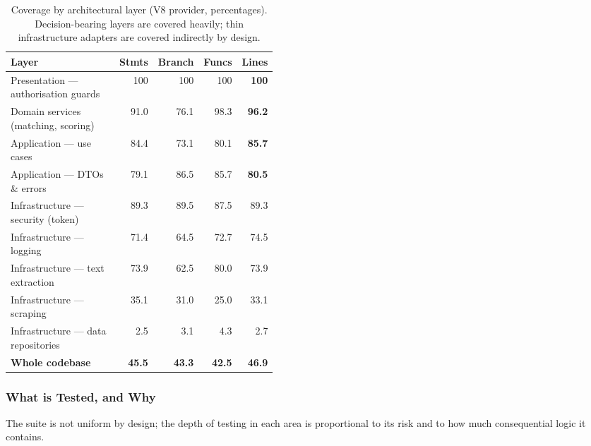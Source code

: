 \begin{table}[H]
\centering
\caption[Coverage by architectural layer]{Coverage by architectural layer
(V8 provider, percentages). Decision-bearing layers are covered heavily;
thin infrastructure adapters are covered indirectly by design.}
\label{tab:coverage-layer}
\small
\begin{tabular}{p{0.44\linewidth}rrrr}
\toprule
\textbf{Layer} & \textbf{Stmts} & \textbf{Branch} & \textbf{Funcs} & \textbf{Lines} \\
\midrule
Presentation --- authorisation guards & 100 & 100 & 100 & \textbf{100} \\
Domain services (matching, scoring) & 91.0 & 76.1 & 98.3 & \textbf{96.2} \\
Application --- use cases & 84.4 & 73.1 & 80.1 & \textbf{85.7} \\
Application --- DTOs \& errors & 79.1 & 86.5 & 85.7 & \textbf{80.5} \\
Infrastructure --- security (token) & 89.3 & 89.5 & 87.5 & 89.3 \\
Infrastructure --- logging & 71.4 & 64.5 & 72.7 & 74.5 \\
Infrastructure --- text extraction & 73.9 & 62.5 & 80.0 & 73.9 \\
Infrastructure --- scraping & 35.1 & 31.0 & 25.0 & 33.1 \\
Infrastructure --- data repositories & 2.5 & 3.1 & 4.3 & 2.7 \\
\midrule
\textbf{Whole codebase} & \textbf{45.5} & \textbf{43.3} & \textbf{42.5} & \textbf{46.9} \\
\bottomrule
\end{tabular}
\end{table}

\subsubsection{What is Tested, and Why}

The suite is not uniform by design; the depth of testing in each area is
proportional to its risk and to how much consequential logic it contains.

